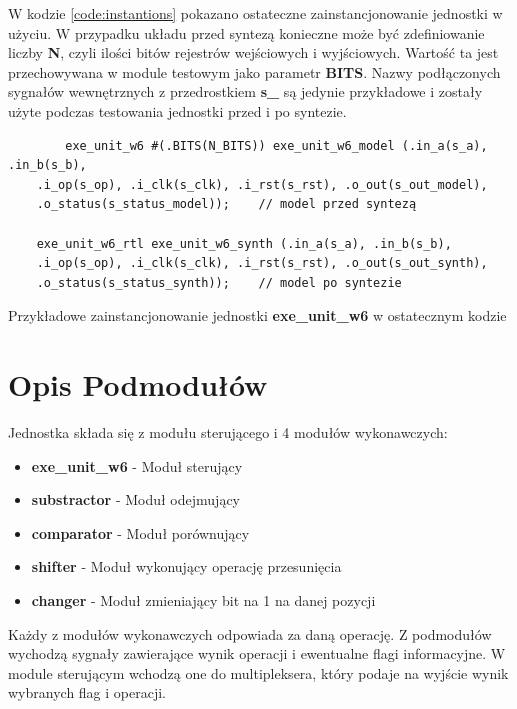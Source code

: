 \documentclass[12pt]{article}
\begin{document}
W kodzie \ref{code:instantions} pokazano ostateczne zainstancjonowanie jednostki w użyciu. W przypadku układu przed syntezą konieczne może być zdefiniowanie liczby \textbf{N}, czyli ilości bitów rejestrów wejściowych i wyjściowych. Wartość ta jest przechowywana w module testowym jako parametr \textbf{BITS}. Nazwy podłączonych sygnałów wewnętrznych z przedrostkiem \textbf{s\_} są jedynie przykładowe i zostały użyte podczas testowania jednostki przed i po syntezie.

\begin{program}
	\begin{verbatim}
		exe_unit_w6 #(.BITS(N_BITS)) exe_unit_w6_model (.in_a(s_a), .in_b(s_b),
	.i_op(s_op), .i_clk(s_clk), .i_rst(s_rst), .o_out(s_out_model),
	.o_status(s_status_model));    // model przed syntezą
	
	exe_unit_w6_rtl exe_unit_w6_synth (.in_a(s_a), .in_b(s_b),
	.i_op(s_op), .i_clk(s_clk), .i_rst(s_rst), .o_out(s_out_synth), 
	.o_status(s_status_synth));    // model po syntezie
	\end{verbatim}
	\caption{Przykładowe zainstancjonowanie jednostki \textbf{exe\_unit\_w6} w ostatecznym kodzie}
	\label{code:instantions}
\end{program}

	\vspace{-20pt}
	\section*{Opis Podmodułów}
	
	Jednostka składa się z modułu sterującego i 4 modułów wykonawczych:
	\begin{itemize}
		\setlength\itemsep{2pt}
		\item \textbf{exe\_unit\_w6} - Moduł sterujący
		\item \textbf{substractor} - Moduł odejmujący
		\item \textbf{comparator} - Moduł porównujący
		\item \textbf{shifter} - Moduł wykonujący operację przesunięcia
		\item \textbf{changer} - Moduł zmieniający bit na 1 na danej pozycji
	\end{itemize}
	Każdy z modułów wykonawczych odpowiada za daną operację. Z podmodułów wychodzą sygnały zawierające wynik operacji i ewentualne flagi informacyjne. W module sterującym wchodzą one do multipleksera, który podaje na wyjście wynik wybranych flag i operacji.
	
	
\end{document}
